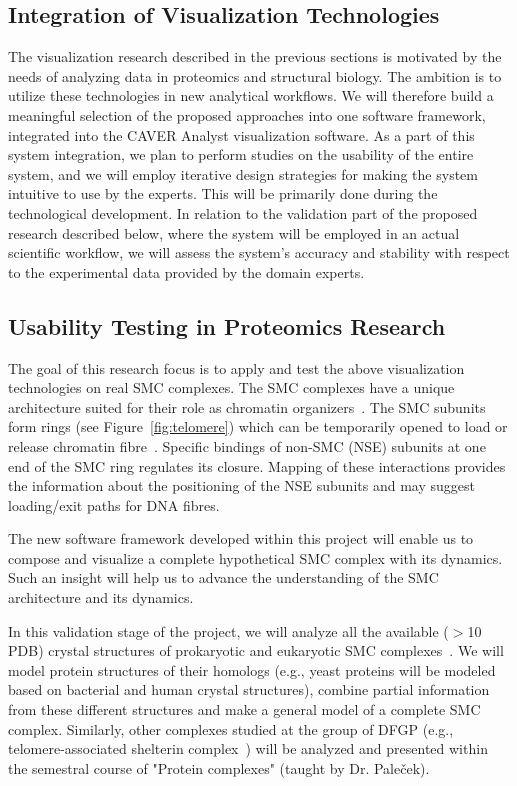 \documentclass[11pt,a4paper,titlepage,oneside,onecolumn]{article}
\begin{document}
\subsection{Integration of Visualization Technologies}

The visualization research described in the previous sections is motivated by the needs of analyzing data in proteomics and structural biology. 
The ambition is to utilize these technologies in new analytical workflows.
We will therefore build a meaningful selection of the proposed approaches into one software framework, integrated into the CAVER Analyst visualization software. 
As a part of this system integration, we plan to perform studies on the usability of the entire system, and we will employ iterative design strategies for making the system intuitive to use by the experts. 
This will be primarily done during the technological development. 
In relation to the validation part of the proposed research described below, where the system will be employed in an actual scientific workflow, we will assess the system's accuracy and stability with respect to the experimental data provided by the domain experts.


\subsection{Usability Testing in Proteomics Research}
\label{sec:smc}
The goal of this research focus is to apply and test the above visualization technologies on real SMC complexes. 
The SMC complexes have a unique architecture suited for their role as chromatin organizers~\cite{Palecek2015}. 
The SMC subunits form rings (see Figure~\ref{fig:telomere}) which can be temporarily opened to load or release chromatin fibre~\cite{Haering2016}. 
Specific bindings of non-SMC (NSE) subunits at one end of the SMC ring regulates its closure. 
Mapping of these interactions provides the information about the positioning of the NSE subunits and may suggest loading/exit paths for DNA fibres.

The new software framework developed within this project will enable us to compose and visualize a complete hypothetical SMC complex with its dynamics. 
Such an insight will help us to advance the understanding of the SMC architecture and its dynamics.
 
In this validation stage of the project, we will analyze all the available ($>$10 PDB) crystal structures of prokaryotic and eukaryotic SMC complexes~\cite{Palecek2015}. 
We will model protein structures of their homologs (e.g., yeast proteins will be modeled based on bacterial and human crystal structures), combine partial information from these different structures and make a general model of a complete SMC complex. 
Similarly, other complexes studied at the group of DFGP (e.g., telomere-associated shelterin complex~\cite{Janouskova2015,Schrumpfova}) will be analyzed and presented within the semestral course of "Protein complexes" (taught by Dr. Pale\v{c}ek).
\end{document}
